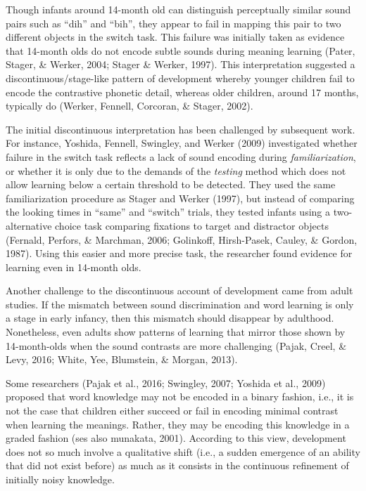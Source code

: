 \documentclass[english,,man,floatsintext]{apa6}
\theoremstyle{definition}
\theoremstyle{definition}
\theoremstyle{definition}
\theoremstyle{remark}
\begin{document}
Though infants around 14-month old can distinguish perceptually similar
sound pairs such as \enquote{dih} and \enquote{bih}, they appear to fail
in mapping this pair to two different objects in the switch task. This
failure was initially taken as evidence that 14-month olds do not encode
subtle sounds during meaning learning (Pater, Stager, \& Werker, 2004;
Stager \& Werker, 1997). This interpretation suggested a
discontinuous/stage-like pattern of development whereby younger children
fail to encode the contrastive phonetic detail, whereas older children,
around 17 months, typically do (Werker, Fennell, Corcoran, \& Stager,
2002).

The initial discontinuous interpretation has been challenged by
subsequent work. For instance, Yoshida, Fennell, Swingley, and Werker
(2009) investigated whether failure in the switch task reflects a lack
of sound encoding during \emph{familiarization}, or whether it is only
due to the demands of the \emph{testing} method which does not allow
learning below a certain threshold to be detected. They used the same
familiarization procedure as Stager and Werker (1997), but instead of
comparing the looking times in \enquote{same} and \enquote{switch}
trials, they tested infants using a two-alternative choice task
comparing fixations to target and distractor objects (Fernald, Perfors,
\& Marchman, 2006; Golinkoff, Hirsh-Pasek, Cauley, \& Gordon, 1987).
Using this easier and more precise task, the researcher found evidence
for learning even in 14-month olds.

Another challenge to the discontinuous account of development came from
adult studies. If the mismatch between sound discrimination and word
learning is only a stage in early infancy, then this mismatch should
disappear by adulthood. Nonetheless, even adults show patterns of
learning that mirror those shown by 14-month-olds when the sound
contrasts are more challenging (Pajak, Creel, \& Levy, 2016; White, Yee,
Blumstein, \& Morgan, 2013).

Some researchers (Pajak et al., 2016; Swingley, 2007; Yoshida et al.,
2009) proposed that word knowledge may not be encoded in a binary
fashion, i.e., it is not the case that children either succeed or fail
in encoding minimal contrast when learning the meanings. Rather, they
may be encoding this knowledge in a graded fashion (ses also munakata,
2001). According to this view, development does not so much involve a
qualitative shift (i.e., a sudden emergence of an ability that did not
exist before) as much as it consists in the continuous refinement of
initially noisy knowledge.
\end{document}

